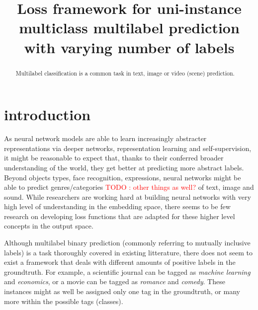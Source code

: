 \documentclass[sigconf,natbib,screen=true,review=true,anonymous]{acmart}
\newcommand\todo[1]{\textcolor{red}{TODO : #1}}
\begin{document}
\title{Loss framework for uni-instance multiclass multilabel prediction with varying number of labels}







\begin{abstract}
Multilabel classification is a common task in text, image or video (scene) prediction.
\end{abstract}



\maketitle

\acresetall

\section{introduction}
\label{sec:org027ce58}

As neural network models are able to learn increasingly abstracter representations via deeper networks, representation learning and self-supervision, it might be reasonable to expect that, thanks to their conferred broader understanding of the world, they get better at predicting more abstract labels. Beyond objects types, face recognition, expressions, neural networks might be able to predict genres/categories \todo{other things as well?} of text, image and sound. While researchers are working hard at building neural networks with very high level of understanding in the embedding space, there seems to be few research on developing loss functions that are adapted for these higher level concepts in the output space.

Although multilabel binary prediction (commonly referring to mutually inclusive labels) is a task thoroughly covered in existing litterature, there does not seem to exist a framework that deals with different amounts of positive labels in the groundtruth. For example, a scientific journal can be tagged as \emph{machine learning} and \emph{economics}, or a movie can be tagged as \emph{romance} and \emph{comedy}. These instances might as well be assigned only one tag in the groundtruth, or many more within the possible tags (classes).
\end{document}
